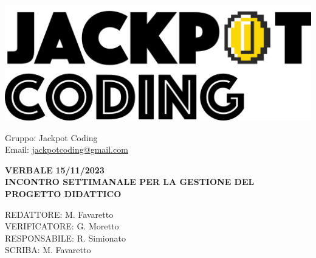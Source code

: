 \documentclass[5pt]{article}
\begin{document}
\begin{minipage}[t]{0.50\textwidth}
    \begin{flushleft}
        \hspace{10pt}
        \includegraphics[scale=0.65]{assets/jackpot-logo.png} 
    \end{flushleft}
\end{minipage}
\hspace{-60pt} %
\begin{flushright}
    \begin{minipage}[t]{0.50\textwidth}
        \begin{flushright}
            Gruppo: {\Large Jackpot Coding}\\
            Email: \href{mailto:jackpotcoding@gmail.com}{jackpotcoding@gmail.com}
        \end{flushright}
    \end{minipage}
\end{flushright}

\vspace{15pt}

\begin{center}
    \textbf{\large VERBALE }
    \textbf{\large 15/11/2023} \\
    \textbf{\Large INCONTRO SETTIMANALE PER LA GESTIONE DEL PROGETTO DIDATTICO}
\end{center}

\vspace{13pt}

\begin{flushleft}
    \begin{spacing}{1.5}
        REDATTORE:  M. Favaretto\\%
        VERIFICATORE: G. Moretto  \\%
        RESPONSABILE:   R. Simionato\\%
        \vspace{7pt}
        SCRIBA: M. Favaretto\\%
    \end{spacing}
\end{flushleft}
\end{document}
